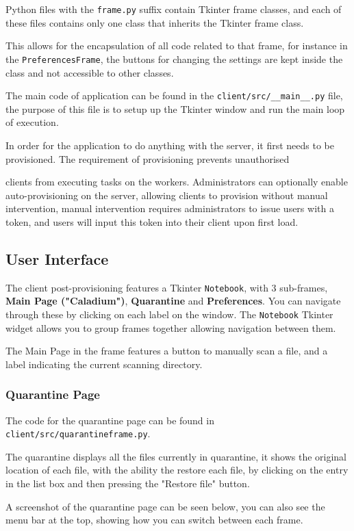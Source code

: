Python files with the \texttt{frame.py} suffix contain Tkinter frame classes,
and each of these files contains only one class that inherits the Tkinter frame class.

This allows for the encapsulation of all code related to that frame,
for instance in the \texttt{PreferencesFrame}, the buttons for changing the settings
are kept inside the class and not accessible to other classes.

The main code of application can be found in the \texttt{client/src/\_\_main\_\_.py} file,
the purpose of this file is to setup up the Tkinter window and run the main loop of execution.

In order for the application to do anything with the server, it first needs to be provisioned.
The requirement of provisioning prevents unauthorised

clients from executing tasks on the workers.
Administrators can optionally enable auto-provisioning on the server,
allowing clients to provision without manual intervention,
manual intervention requires administrators to issue users with a token,
and users will input this token into their client upon first load.

\subsection{User Interface}
The client post-provisioning features a Tkinter \texttt{Notebook},
with 3 sub-frames, \textbf{Main Page ("Caladium")},
\textbf{Quarantine} and \textbf{Preferences}.
You can navigate through these by clicking on each label on the window.
The \texttt{Notebook} Tkinter widget allows you to
group frames together allowing navigation between them.

The Main Page in the frame features a button to manually scan a file,
and a label indicating the current scanning directory.

\subsubsection{Quarantine Page}
The code for the quarantine page can be found in \texttt{client/src/quarantineframe.py}.

The quarantine displays all the files currently in quarantine,
it shows the original location of each file,
with the ability the restore each file,
by clicking on the entry in the list box and then pressing the "Restore file" button.

A screenshot of the quarantine page can be seen below,
you can also see the menu bar at the top,
showing how you can switch between each frame.

